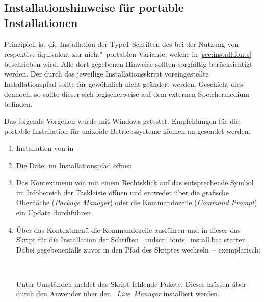 \subsection{%
  Installationshinweise für portable Installationen%
  \label{sec:install:portable}%
}
%
Prinzipiell ist die Installation der Type1-Schriften des \CDs bei der Nutzung 
von  respektive 
 äquivalent zur nicht"~portablen 
Variante, welche in \autoref{sec:install:fonts} beschrieben wird. Alle dort 
gegebenen Hinweise sollten sorgfältig berücksichtigt werden. Der durch das 
jeweilige Installationsskript voreingestellte Installationspfad sollte für 
gewöhnlich nicht geändert werden. Geschieht dies dennoch, so sollte dieser sich 
logischerweise auf dem externen Speichermedium   
 befinden.

%
Das folgende Vorgehen wurde mit Windows getestet. Empfehlungen für die portable 
Installation für unixoide Betriebssysteme können an \mailto{\TUDScriptContact} 
gesendet werden.
\begin{enumerate}
\item Installation von  in 
\item Die Datei  im Installationspfad öffnen
\item Das Kontextmenü von  mit einem 
  Rechtsklick auf das entsprechende Symbol im Infobereich der Taskleiste    
  öffnen und entweder über die grafische Oberfläche (\emph{Package Manager}) 
  oder die Kommandozeile (\emph{Command Prompt}) ein Update durchführen
\item Über das Kontextmenü die Kommandozeile ausführen und in dieser das Skript 
  für die Installation der Schriften \File||{tudscr_fonts_install.bat} 
  starten. Dabei gegebenenfalls zuvor in den Pfad des Skriptes 
  wechseln~-- exemplarisch:
  \begin{quoting}[leftmargin=1.5em,rightmargin=0pt]
  \newline%
  \,
  \end{quoting}
  Unter Umständen meldet das Skript fehlende Pakete. Dieses müssen über durch 
  den Anwender über den \emph{~Live~Manager} installiert werden.
\end{enumerate}

